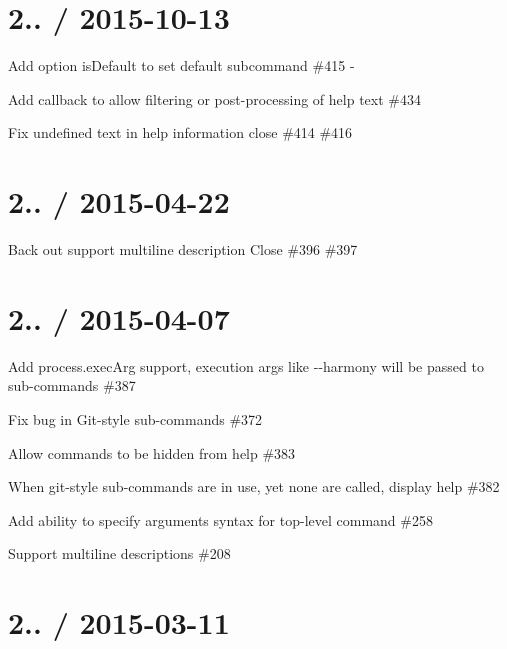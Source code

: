 \section*{2.. / 2015-\/10-\/13 }


\begin{DoxyItemize}
\item Add option {\ttfamily is\+Default} to set default subcommand \#415 -\/
\item Add callback to allow filtering or post-\/processing of help text \#434 
\item Fix {\ttfamily undefined} text in help information close \#414 \#416 
\end{DoxyItemize}

\section*{2.. / 2015-\/04-\/22 }


\begin{DoxyItemize}
\item Back out {\ttfamily support multiline description} Close \#396 \#397
\end{DoxyItemize}

\section*{2.. / 2015-\/04-\/07 }


\begin{DoxyItemize}
\item Add {\ttfamily process.\+exec\+Arg} support, execution args like {\ttfamily -\/-\/harmony} will be passed to sub-\/commands \#387  
\item Fix bug in Git-\/style sub-\/commands \#372 
\item Allow commands to be hidden from help \#383 
\item When git-\/style sub-\/commands are in use, yet none are called, display help \#382 
\item Add ability to specify arguments syntax for top-\/level command \#258 
\item Support multiline descriptions \#208 
\end{DoxyItemize}

\section*{2.. / 2015-\/03-\/11 }


